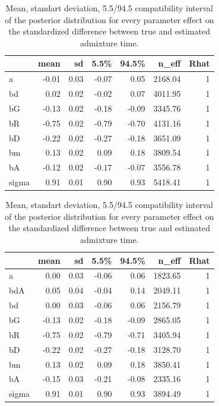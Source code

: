 \documentclass[11pt]{article}
\begin{document}
\begin{table}[H]

\caption{\label{tab:tableSGLM1}\label{tab:tableS1} Mean, standart deviation, 5.5/94.5 compatibility interval of the posterior distribution for every parameter effect on the standardized difference between true and estimated admixture time.}
\centering
\begin{tabular}[t]{l|r|r|r|r|r|r}
\hline
  & mean & sd & 5.5\% & 94.5\% & n\_eff & Rhat\\
\hline
a & -0.01 & 0.03 & -0.07 & 0.05 & 2168.04 & 1\\
\cline{1-7}
bd & 0.02 & 0.02 & -0.02 & 0.07 & 4011.95 & 1\\
\cline{1-7}
bG & -0.13 & 0.02 & -0.18 & -0.09 & 3345.76 & 1\\
\cline{1-7}
bR & -0.75 & 0.02 & -0.79 & -0.70 & 4131.16 & 1\\
\cline{1-7}
bD & -0.22 & 0.02 & -0.27 & -0.18 & 3651.09 & 1\\
\cline{1-7}
bm & 0.13 & 0.02 & 0.09 & 0.18 & 3809.54 & 1\\
\cline{1-7}
bA & -0.12 & 0.02 & -0.17 & -0.07 & 3556.78 & 1\\
\cline{1-7}
sigma & 0.91 & 0.01 & 0.90 & 0.93 & 5418.41 & 1\\
\hline
\end{tabular}
\end{table}

\begin{table}[H]

\caption{\label{tab:tableSGLM2}\label{tab:tableS1} Mean, standart deviation, 5.5/94.5 compatibility interval of the posterior distribution for every parameter effect on the standardized difference between true and estimated admixture time.}
\centering
\begin{tabular}[t]{l|r|r|r|r|r|r}
\hline
  & mean & sd & 5.5\% & 94.5\% & n\_eff & Rhat\\
\hline
a & 0.00 & 0.03 & -0.06 & 0.06 & 1823.65 & 1\\
\cline{1-7}
bdA & 0.05 & 0.04 & -0.04 & 0.14 & 2049.11 & 1\\
\cline{1-7}
bd & 0.00 & 0.03 & -0.06 & 0.06 & 2156.79 & 1\\
\cline{1-7}
bG & -0.13 & 0.02 & -0.18 & -0.09 & 2865.05 & 1\\
\cline{1-7}
bR & -0.75 & 0.02 & -0.79 & -0.71 & 3405.94 & 1\\
\cline{1-7}
bD & -0.22 & 0.02 & -0.27 & -0.18 & 3128.70 & 1\\
\cline{1-7}
bm & 0.13 & 0.02 & 0.09 & 0.18 & 3850.41 & 1\\
\cline{1-7}
bA & -0.15 & 0.03 & -0.21 & -0.08 & 2335.16 & 1\\
\cline{1-7}
sigma & 0.91 & 0.01 & 0.90 & 0.93 & 3894.49 & 1\\
\hline
\end{tabular}
\end{table}
\end{document}
